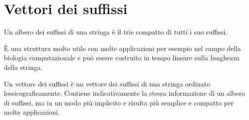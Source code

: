 \documentclass[\main/main.tex]{subfiles}
\begin{document}
\chapter{Vettori dei suffissi}
\begin{multicols}{2}
\begin{definition}
    Un albero dei suffissi di una stringa è il trie compatto di tutti i suo suffissi.
    
    È una struttura molto utile con molte applicazioni per esempio nel campo della biologia computazionale e può essere costruito in tempo lineare sulla lunghezza della stringa.
\end{definition}
\begin{definition}
    Un vettore dei suffissi è un vettore dei suffissi di una stringa ordinato lessicograficamente. Contiene indicativamente la stessa informazione di un albero di suffissi, ma in un modo più implicito e risulta più semplice e compatto per molte applicazioni.
\end{definition}
\end{multicols}
\end{document}
